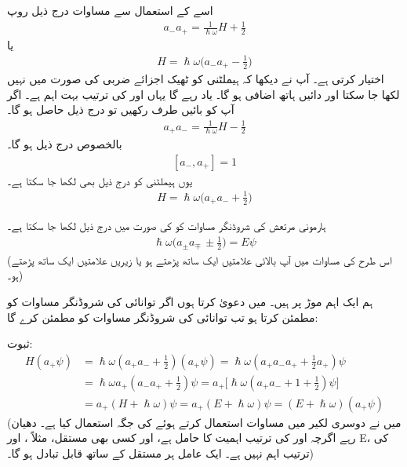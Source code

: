 اسے کے استعمال سے مساوات  درج ذیل روپ  
\begin{align}
a_{-}a_{+}=\frac{1}{\hslash\omega}H+\frac{1}{2}
\end{align}
یا
\begin{align}
H=\hslash\omega\big (a_{-}a_{+}-\frac{1}{2} \big )
\end{align}
اختیار کرتی ہے۔ آپ نے دیکھا کہ ہیملٹنی کو ٹھیک اجزائے ضربی کی صورت میں نہیں لکھا جا سکتا  اور دائیں ہاتھ اضافی  ہو گا۔ یاد رہے گا یہاں  اور  کی ترتیب بہت اہم ہے۔ اگر آپ  کو بائیں طرف رکھیں تو درج ذیل حاصل ہو گا۔
\begin{align}
a_{+}a_{-}=\frac{1}{\hslash\omega}H-\frac{1}{2}
\end{align}
بالخصوص درج ذیل ہو گا۔
\begin{align}\label{مساوات_شروڈنگر_سیڑھی_ضرب_برابر_اکائی}
[a_{-},a_{+}]=1
\end{align}
یوں ہیملٹنی کو درج ذیل بھی لکھا جا سکتا ہے۔
\begin{align}
H=\hslash\omega\big (a_{+}a_{-}+\frac{1}{2}\big )
\end{align}


ہارمونی مرتعش کی شروڈنگر مساوات کو  کی صورت میں  درج ذیل لکھا جا سکتا ہے۔
\begin{align}\label{مساوات_شروڈنگر_عوامل_روپ}
 \hslash \omega \big(a_{\pm} a_{\mp} \,\pm \frac{1}{2}\big)=E\psi  		
\end{align}
(اس  طرح کی مساوات میں آپ بالائی علامتیں ایک ساتھ پڑھتے ہو یا زیریں علامتیں ایک ساتھ پڑھتے ہو۔)

 ہم ایک اہم موڑ پر ہیں۔ میں دعویٰ کرتا ہوں  اگر    توانائی  کی شروڈنگر  مساوات کو  مطمئن کرتا ہو 
  تب  توانائی  کی شروڈنگر  مساوات کو   مطمئن کرے گا:  

ثبوت:
\begin{align*}
H ( a_+ \psi ) &= \hslash \omega ( a_+ a_- + \frac{1}{2}) (a_+ \psi) = \hslash \omega (a_+ a_- a_+ +  \frac{1}{2}  a_+) \psi
\\
  &= \hslash \omega a_+ ( a_- a_+ + \tfrac{1}{2} ) \psi  = a_+\big[ \hslash \omega ( a_+ a_- + 1 + \tfrac{1}{2} ) \psi \big ]\\
  &= a_+ ( H + \hslash \omega ) \psi = a_+ ( E + \hslash \omega ) \psi = ( E + \hslash \omega ) ( a_+ \psi )
\end{align*}  
(میں نے دوسری لکیر میں مساوات  استعمال کرتے ہوئے  
 کی جگہ    استعمال کیا ہے۔ دھیان  رہے اگرچہ   اور   کی ترتیب اہمیت کا حامل ہے،  
   اور کسی بھی مستقل، مثلاً ،  اور E،   کی ترتیب اہم نہیں ہے۔ ایک عامل ہر مستقل کے ساتھ قابل تبادل ہو گا۔)

